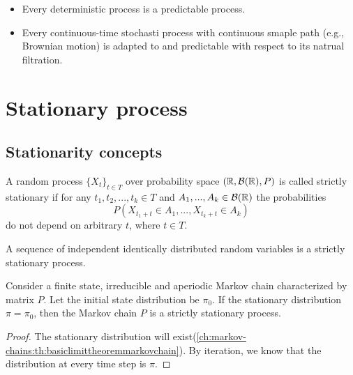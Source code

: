 \begin{refsection}
\begin{example}\hfill
\begin{itemize}
	\item Every deterministic process is a predictable process.
	\item Every continuous-time stochasti process with continuous smaple path (e.g., Brownian motion) is adapted to and predictable with respect to its natrual filtration.
\end{itemize}	
\end{example}


\begin{example}
\end{example}


\section{Stationary process}
\subsection{Stationarity concepts}
\begin{definition}\cite[231]{koralov2007theory}\cite[30]{lindgren2013stationary}
	A random process $\{X_t\}_{t\in T}$ over probability space $(\mathbb{R}, \mathcal{B}(\mathbb{R}), P)$ is called strictly stationary if for any $t_1,t_2,...,t_k\in T$ and $A_1,...,A_k \in \mathcal{B}(\mathbb{R})$
	the probabilities
	$$P(X_{t_1 + t}\in A_1,...,X_{t_k + t}\in A_k)$$
	do not depend on arbitrary $t$, where $t\in T$.
\end{definition}

\begin{example}
	A sequence of independent identically distributed random variables is a strictly stationary process.
\end{example}

\begin{lemma}\cite[231]{koralov2007theory}
	Consider a finite state, irreducible and aperiodic Markov chain characterized by matrix $P$. Let the initial state distribution be $\pi_0$. If the stationary distribution $\pi = \pi_0$, then the Markov chain $P$ is a strictly stationary process.
\end{lemma}
\begin{proof}
	The stationary distribution will exist(\autoref{ch:markov-chains:th:basiclimittheoremmarkovchain}). By iteration, we know that the distribution at every time step is $\pi$. 
\end{proof}





\end{refsection}
